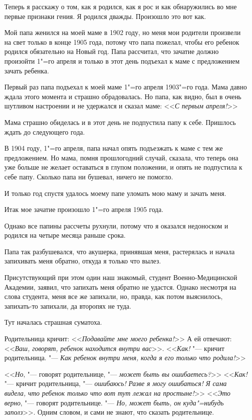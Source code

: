 Теперь я расскажу о том, как я родился, как я рос и как обнаружились во мне первые признаки гения. Я родился дважды. Произошло это вот как.

Мой папа женился на моей маме в 1902 году, но меня мои родители произвели на свет только в конце 1905 года, потому что папа пожелал, чтобы его ребенок родился обязательно на Новый год. Папа рассчитал, что зачатие должно произойти 1"=го апреля и только в этот день подъехал к маме с предложением зачать ребенка.

Первый раз папа подъехал к моей маме 1"=го апреля 1903"=го года. Мама давно ждала этого момента и страшно обрадовалась. Но папа, как видно, был в очень шутливом настроении и не удержался и сказал маме: <<\textit{С первым апреля!}>>

Мама страшно обиделась и в этот день не подпустила папу к себе. Пришлось ждать до следующего года.

В 1904 году, 1"=го апреля, папа начал опять подъезжать к маме с тем же предложением. Но мама, помня прошлогодний случай, сказала, что теперь она уже больше не желает оставаться в глупом положении, и опять не подпустила к себе папу. Сколько папа ни бушевал, ничего не помогло.

И только год спустя удалось моему папе уломать мою маму и зачать меня.

Итак мое зачатие произошло 1"=го апреля 1905 года.

Однако все папины рассчеты рухнули, потому что я оказался недоноском и родился на четыре месяца раньше срока.

Папа так разбушевался, что акушерка, принявшая меня, растерялась и начала запихивать меня обратно, откуда я только что вылез.

Присутствующий при этом один наш знакомый, студент Военно-Медицинской Академии, заявил, что запихать меня обратно не удастся. Однако несмотря на слова студента, меня все же запихали, но, правда, как потом выяснилось, запихать-то запихали, да второпях не туда.

Тут началась страшная суматоха.

Родительница кричит: <<\textit{Подавайте мне моего ребенка!}>> А ей отвечают: <<\textit{Ваш, говорят, ребенок находится внутри вас}>>. <<\textit{Как!} "--- кричит родительница. "--- \textit{Как ребенок внутри меня, когда я его только что родила!}>>

<<\textit{Но}, "--- говорят родительнице, "--- \textit{может быть вы ошибаетесь?}>> <<\textit{Как!} "--- кричит родительница, "--- \textit{ошибаюсь! Разве я могу ошибаться! Я сама видела, что ребенок только что вот тут лежал на простыне!}>> <<\textit{Это верно}, "--- говорят родительнице. "--- \textit{Но, может быть, он куда"=нибудь заполз}>>. Одним словом, и сами не знают, что сказать родительнице.

